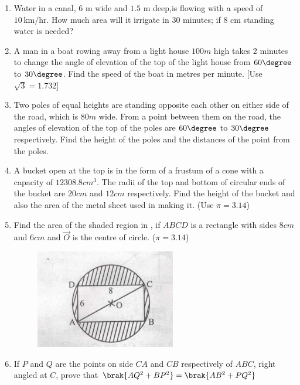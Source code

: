 \begin{enumerate}
\item Water in a canal, $6$ m wide and $1.5$ m deep,is flowing with a speed of $10 \,\text{km/hr}$. How much area will it irrigate in $30$ minutes; if $8$ cm standing water is needed?
\item A man in a boat rowing away from a light house $100m$  high takes $2$ minutes to change the angle of elevation of the top of the light house from $60\degree$ to $30\degree$. Find the speed of the boat in metres per minute. [Use $\sqrt{3}=1.732$]
\item Two poles of equal heights are standing opposite each other on either side of the road, which is $80 m$  wide. From a point between them on the road, the angles of elevation of the top of the poles are $60\degree$ to $30\degree$ respectively. Find the height of the poles and the distances of the point from the poles.
\item A bucket open at the top is in the form of a frustum of a cone with a capacity of $12308.8 cm^3$. The radii of the top and bottom of circular ends of the bucket are $20 cm$ and $12cm$ respectively. Find the height of the bucket and also the area of the metal sheet used in making it. (Use  $\pi= 3.14$)
\item Find the area of the shaded region in , if $ABCD$ is a rectangle with sides $8 cm$ and $6 cm$ and $\vec{O}$ is the centre of circle. ($\pi = 3.14$)
\begin{figure}[H]                                     \centering
	\includegraphics[width=\columnwidth]{figs/i1.jpg}
		\caption{}
		\label{fig:figure4}

                \end{figure}
\item If $P$ and $Q$ are the points on side $CA$ and $CB$ respectively of  $ABC$, right angled at $C$, prove that $\brak{AQ^2 + BP^2} = \brak{AB^2 +PQ^2}$
\end{enumerate}